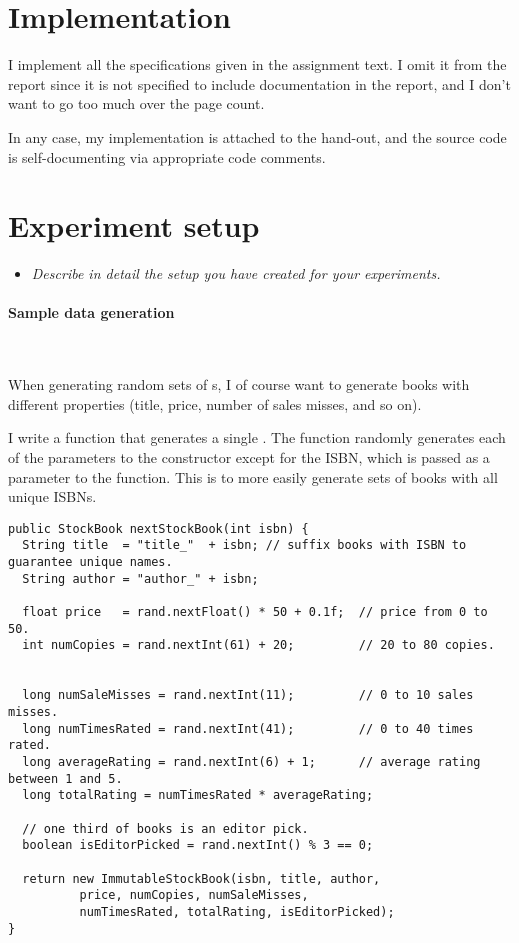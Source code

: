 \newpage
\section{Implementation}

I implement all the specifications given in the assignment text. I omit it from
the report since it is not specified to include documentation in the report, and
I don't want to go too much over the page count.
\medskip

In any case, my implementation is attached to the hand-out, and the source code
is self-documenting via appropriate code comments.

\tykstreg


\newpage
\section{Experiment setup}

\begin{itemize}
  \item \textit{Describe in detail the setup you have created for your
    experiments.}
\end{itemize}

\paragraph{Sample data generation}~
\smallskip

When generating random sets of s, I of course want to
generate books with different properties (title, price, number of sales misses,
and so on). \medskip

I write a function that generates a single . The function randomly
generates each of the parameters to the  constructor
except for the ISBN, which is passed as a parameter to the function. This is to
more easily generate sets of books with all unique ISBNs.

\begin{verbatim}
public StockBook nextStockBook(int isbn) {
  String title  = "title_"  + isbn; // suffix books with ISBN to guarantee unique names.
  String author = "author_" + isbn;

  float price   = rand.nextFloat() * 50 + 0.1f;  // price from 0 to 50.
  int numCopies = rand.nextInt(61) + 20;         // 20 to 80 copies.


  long numSaleMisses = rand.nextInt(11);         // 0 to 10 sales misses.
  long numTimesRated = rand.nextInt(41);         // 0 to 40 times rated.
  long averageRating = rand.nextInt(6) + 1;      // average rating between 1 and 5.
  long totalRating = numTimesRated * averageRating;

  // one third of books is an editor pick.
  boolean isEditorPicked = rand.nextInt() % 3 == 0;

  return new ImmutableStockBook(isbn, title, author,
          price, numCopies, numSaleMisses,
          numTimesRated, totalRating, isEditorPicked);
}
\end{verbatim}

